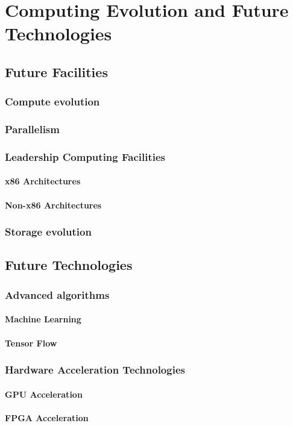 
%
\chapter{Computing Evolution and Future Technologies} 
\section{Future Facilities}
\subsection{Compute evolution}
\subsection{Parallelism}
\subsection{Leadership Computing Facilities}
\subsubsection{x86 Architectures}
\subsubsection{Non-x86 Architectures}
\subsection{Storage evolution}
\section{Future Technologies}
\subsection{Advanced algorithms}
\subsubsection{Machine Learning}
\subsubsection{Tensor Flow}
\subsection{Hardware Acceleration Technologies}
\subsubsection{GPU Acceleration}
\subsubsection{FPGA Acceleration}
